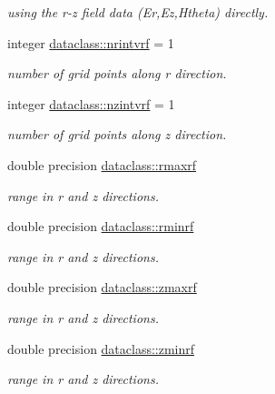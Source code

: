 \textbf{ }\par
{\em using the r-\/z field data (Er,Ez,Htheta) directly. }\begin{DoxyCompactItemize}
\item 
integer \mbox{\hyperlink{namespacedataclass_a3b9a2feb5ab8139d532626cad00a9769}{dataclass\+::nrintvrf}} = 1
\begin{DoxyCompactList}\small\item\em number of grid points along r direction. \end{DoxyCompactList}\item 
integer \mbox{\hyperlink{namespacedataclass_a7dee8b652907c73253c32891a2a08514}{dataclass\+::nzintvrf}} = 1
\begin{DoxyCompactList}\small\item\em number of grid points along z direction. \end{DoxyCompactList}\end{DoxyCompactItemize}

\textbf{ }\par
\begin{DoxyCompactItemize}
\item 
double precision \mbox{\hyperlink{namespacedataclass_a8ea08da279b20aa500095cba377a2de2}{dataclass\+::rmaxrf}}
\begin{DoxyCompactList}\small\item\em range in r and z directions. \end{DoxyCompactList}\item 
double precision \mbox{\hyperlink{namespacedataclass_aae1944e971e5c71db5d8f21afceb0935}{dataclass\+::rminrf}}
\begin{DoxyCompactList}\small\item\em range in r and z directions. \end{DoxyCompactList}\item 
double precision \mbox{\hyperlink{namespacedataclass_a4646788256b1b461413c546d6df8ee88}{dataclass\+::zmaxrf}}
\begin{DoxyCompactList}\small\item\em range in r and z directions. \end{DoxyCompactList}\item 
double precision \mbox{\hyperlink{namespacedataclass_a24985c63a3d2c04ccb2cf299eff0c626}{dataclass\+::zminrf}}
\begin{DoxyCompactList}\small\item\em range in r and z directions. \end{DoxyCompactList}\end{DoxyCompactItemize}


